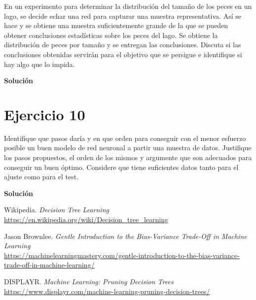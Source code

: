 \documentclass[11pt,a4paper]{article}
\newcommand{\answer}{\noindent\textbf{Solución}}
\newcommand{\addtoc}[1]{\addcontentsline{toc}{section}{#1}}
\begin{document}
\noindent En un experimento para determinar la distribución del tamaño de los peces en un lago, se
decide echar una red para capturar una muestra representativa. Así se hace y se obtiene
una muestra suficientemente grande de la que se pueden obtener conclusiones estadísticas
sobre los peces del lago. Se obtiene la distribución de peces por tamaño y se entregan las
conclusiones. Discuta si las conclusiones obtenidas servirán para el objetivo que se persigue
e identifique si hay algo que lo impida.

\answer

\section*{Ejercicio 10}
\addtoc{Ejercicio 10}

\noindent Identifique que pasos daría y en que orden para conseguir con el menor esfuerzo posible un
buen modelo de red neuronal a partir una muestra de datos. Justifique los pasos propuestos,
el orden de los mismos y argumente que son adecuados para conseguir un buen óptimo.
Considere que tiene suficientes datos tanto para el ajuste como para el test.

\answer

\newpage

\begin{thebibliography}{5}

Wikipedia. \textit{Decision Tree Learning}
\\\url{https://en.wikipedia.org/wiki/Decision_tree_learning}

Jason Brownlee. \textit{Gentle Introduction to the Bias-Variance Trade-Off in Machine Learning}
\\\url{https://machinelearningmastery.com/gentle-introduction-to-the-bias-variance-trade-off-in-machine-learning/}

DISPLAYR. \textit{Machine Learning: Pruning Decision Trees}
\\\url{https://www.displayr.com/machine-learning-pruning-decision-trees/}

\end{thebibliography}
\end{document}
